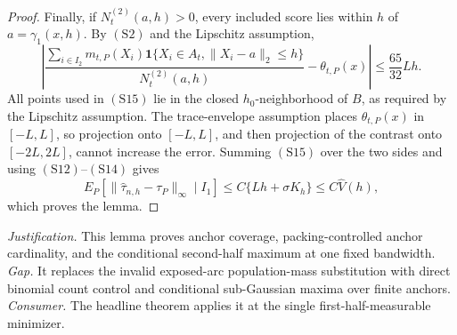 \documentclass{article}
\begin{document}
\begin{proof}
Finally, if \(N^{(2)}_t(a,h)>0\), every included score lies within \(h\) of
\(a=\gamma_1(x,h)\).  By \((\mathrm{S2})\) and the Lipschitz assumption,
\[
 \left|
 \frac{\sum_{i\in I_2}m_{t,P}(X_i)
 \mathbf1\{X_i\in A_t,\|X_i-a\|_2\leq h\}}
 {N^{(2)}_t(a,h)}
 -\theta_{t,P}(x)\right|
 \leq\frac{65}{32}Lh.                                             \tag{S15}
\]
All points used in \((\mathrm{S15})\) lie in the closed \(h_0\)-neighborhood
of \(B\), as required by the Lipschitz assumption.  The trace-envelope
assumption places \(\theta_{t,P}(x)\) in \([-L,L]\), so projection onto
\([-L,L]\), and then projection of the contrast onto \([-2L,2L]\), cannot
increase the error.  Summing \((\mathrm{S15})\) over the two sides and using
\((\mathrm{S12})\)--\((\mathrm{S14})\) gives
\[
 E_P[\|\widehat\tau_{n,h}-\tau_P\|_\infty\mid I_1]
 \leq C\{Lh+\sigma K_h\}\leq C\widehat V(h),
\]
which proves the lemma.
\end{proof}
\par\smallskip\noindent \textit{Justification.} This lemma proves anchor coverage, packing-controlled anchor cardinality, and the conditional second-half maximum at one fixed bandwidth. \textit{Gap.} It replaces the invalid exposed-arc population-mass substitution with direct binomial count control and conditional sub-Gaussian maxima over finite anchors. \textit{Consumer.} The headline theorem applies it at the single first-half-measurable minimizer.
\end{document}
